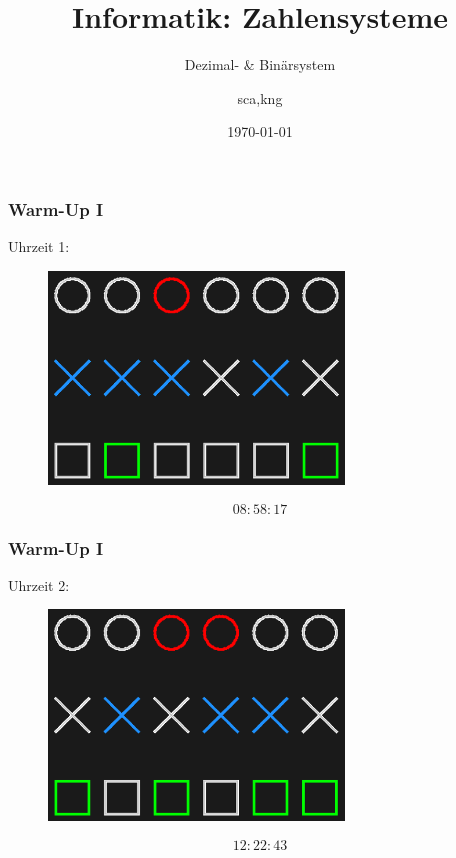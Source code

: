\documentclass{beamer}
\title{Informatik: Zahlensysteme}
\subtitle{Dezimal- \& Binärsystem}
\author{sca,kng}
\institute{KSR}
\date{\today}
\begin{document}
\begin{frame}
    \titlepage
\end{frame}

\begin{frame}
    \frametitle{Warm-Up I}
    Uhrzeit 1:
    \begin{figure}[H]
        \centering
        \includegraphics[width=0.7\textwidth]{08_58_17_dark}
    \end{figure}
     $$08:58:17$$
\end{frame}

\begin{frame}
    \frametitle{Warm-Up I}
    Uhrzeit 2:
    \begin{figure}[H]
        \centering
        \includegraphics[width=0.7\textwidth]{12_22_43_dark}
    \end{figure}
     $$12:22:43$$
\end{frame}
\end{document}

